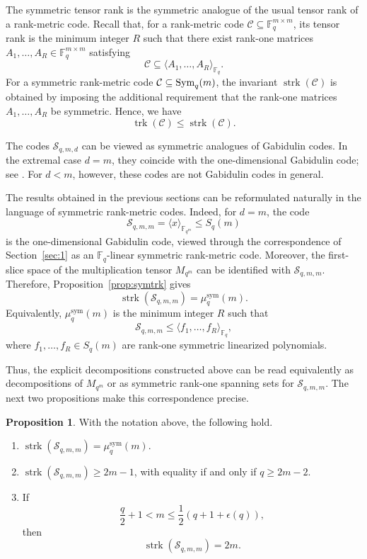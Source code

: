\documentclass[11pt,a4paper,reqno]{article}
\numberwithin{equation}{section}
\theoremstyle{definition}
\newtheorem{proposition}[theorem]{Proposition}
\newcommand{\Sym}{{\textnormal{Sym}}}
\begin{document}
The symmetric tensor rank is the symmetric analogue of the usual tensor rank of
a rank-metric code. Recall that, for a rank-metric code
\(\mathcal C\subseteq \mathbb F_q^{m\times m}\), its tensor rank is the minimum
integer \(R\) such that there exist rank-one matrices
\(A_1,\ldots,A_R\in \mathbb F_q^{m\times m}\) satisfying
\[
\mathcal C\subseteq \langle A_1,\ldots,A_R\rangle_{\mathbb F_q}.
\]
For a symmetric rank-metric code \(\mathcal C\subseteq \Sym_q(m)\), the invariant
\(\operatorname{strk}(\mathcal C)\) is obtained by imposing the additional
requirement that the rank-one matrices \(A_1,\ldots,A_R\) be symmetric. Hence, we have
\[
\operatorname{trk}(\mathcal C)\le \operatorname{strk}(\mathcal C).
\]

The codes \(\mathcal S_{q,m,d}\) can be viewed as symmetric
analogues of Gabidulin codes. In the extremal case \(d=m\), they coincide with
the one-dimensional Gabidulin code; see
\cite[Proposition~3.1]{longobardi2020automorphism}. For \(d<m\), however, these
codes are not Gabidulin codes in general.

The results obtained in the previous sections can be reformulated naturally in
the language of symmetric rank-metric codes. Indeed, for \(d=m\), the code
\[
\mathcal S_{q,m,m}=\langle x\rangle_{\mathbb F_{q^m}}\leq S_q(m)
\]
is the one-dimensional Gabidulin code, viewed through the correspondence of
Section~\ref{sec:1} as an \(\mathbb F_q\)-linear symmetric
rank-metric code. Moreover, the first-slice space of the multiplication tensor
\(M_{q^m}\) can be identified with \(\mathcal S_{q,m,m}\). Therefore,
Proposition~\ref{prop:symtrk} gives
\[
\operatorname{strk}(\mathcal S_{q,m,m})=\mu_q^{\mathrm{sym}}(m).
\]
Equivalently, \(\mu_q^{\mathrm{sym}}(m)\) is the minimum integer \(R\) such that
\[
\mathcal S_{q,m,m}
\leq
\langle f_1,\ldots,f_R\rangle_{\mathbb F_q},
\]
where \(f_1,\ldots,f_R\in S_q(m)\) are rank-one symmetric linearized
polynomials.

Thus, the explicit decompositions constructed above can be read equivalently as
decompositions of \(M_{q^m}\) or as symmetric rank-one spanning sets for
\(\mathcal S_{q,m,m}\). The next two propositions make this correspondence
precise.

\begin{proposition}
With the notation above, the following hold.
\begin{enumerate}
    \item \(\operatorname{strk}(\mathcal S_{q,m,m})=\mu_q^{\mathrm{sym}}(m)\).
    \item \(\operatorname{strk}(\mathcal S_{q,m,m})\ge 2m-1\), with equality if and only if \(q\ge 2m-2\).
    \item If
    \[
    \frac q2+1<m\le \frac{1}{2}(q+1+\epsilon(q)),
    \]
    then
    \[
    \operatorname{strk}(\mathcal S_{q,m,m})=2m.
    \]
\end{enumerate}
\end{proposition}
\end{document}
